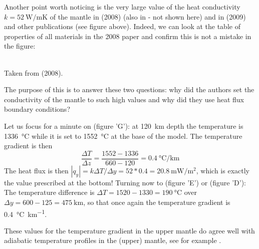 Another point worth noticing is the very large value of the heat conductivity 
$k=52~\si{\watt\per\meter\kelvin}$
of the mantle in \textcite{wabj08} (2008) (also in \textcite{wabj08b,wabj08c} - not shown here) and 
in \textcite{bejb09} (2009) and other publications (see figure above).
Indeed, we can look at the table of properties of all materials in the 2008 paper and confirm 
this is not a mistake in the figure:

\begin{center}
\\
{\captionfont Taken from \textcite{wabj08} (2008).}
\end{center}

The purpose of this \stone is to answer these two questions: why did the authors set the 
conductivity of the mantle to such high values and why did they use heat flux boundary conditions?

Let us focus for a minute on \textcite{bejb09} (figure 'G'): at \SI{120}{\km} depth the temperature is \SI{1336}{\celsius}
while it is set to \SI{1552}{\celsius} at the base of the model. 
The temperature gradient is then 
\[
\frac{\Delta T}{\Delta z} = \frac{1552-1336}{660-120} = 0.4~\si{\celsius\per\km}
\]
The heat flux is then $|q_y|=k \Delta T/\Delta y = 52*0.4=
20.8~\si{\milli\watt\per\square\meter}$, which is exactly the value prescribed 
at the bottom!
Turning now to \textcite{hube14} (figure 'E') or \textcite{hube11} (figure 'D'): 
The temperature difference is 
$\Delta T=1520-1330=190~\si{\celsius}$ 
over $\Delta y=600-125=475~\si{\km}$, so that once again the 
temperature gradient is 0.4~\si{\celsius\per\km}.

These values for the temperature gradient in the upper mantle do agree well 
with adiabatic temperature profiles in the (upper) mantle, see for example 
\textcite{kayy10}. 

